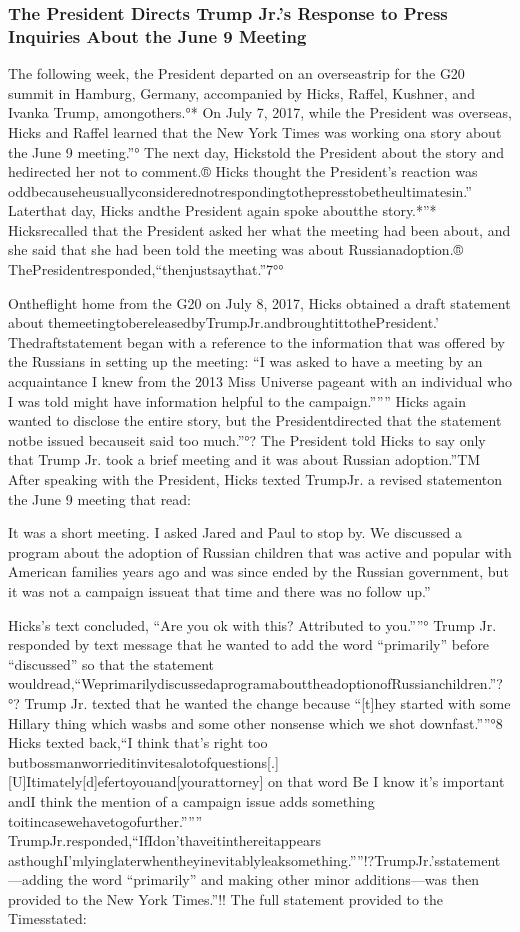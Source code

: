 \subsubsection{The President Directs Trump Jr.’s Response to Press Inquiries About the June 9 Meeting}

The following week, the President departed on an overseastrip for the G20 summit in Hamburg, Germany, accompanied by Hicks, Raffel, Kushner, and Ivanka Trump, amongothers.°* On July 7, 2017, while the President was overseas, Hicks and Raffel learned that the New York Times was working ona story about the June 9 meeting.”° The next day, Hickstold the President about the story and hedirected her not to comment.® Hicks thought the President’s reaction was oddbecauseheusuallyconsiderednotrespondingtothepresstobetheultimatesin.” Laterthat day, Hicks andthe President again spoke aboutthe story.*”* Hicksrecalled that the President asked her what the meeting had been about, and she said that she had been told the meeting was about Russianadoption.® ThePresidentresponded,“thenjustsaythat.”7°°

Ontheflight home from the G20 on July 8, 2017, Hicks obtained a draft statement about themeetingtobereleasedbyTrumpJr.andbroughtittothePresident.’ Thedraftstatement began with a reference to the information that was offered by the Russians in setting up the meeting: “I was asked to have a meeting by an acquaintance I knew from the 2013 Miss Universe pageant with an individual who I was told might have information helpful to the campaign.””” Hicks again wanted to disclose the entire story, but the Presidentdirected that the statement notbe
issued becauseit said too much.”°? The President told Hicks to say only that Trump Jr. took a brief meeting and it was about Russian adoption.”TM After speaking with the President, Hicks texted TrumpJr. a revised statementon the June 9 meeting that read:

It was a short meeting. I asked Jared and Paul to stop by. We discussed a program about the adoption of Russian children that was active and popular with American families years ago and was since ended by the Russian government, but it was not a campaign issueat that time and there was no follow up.”

Hicks’s text concluded, “Are you ok with this? Attributed to you.””° Trump Jr. responded by text message that he wanted to add the word “primarily” before “discussed” so that the statement wouldread,“WeprimarilydiscussedaprogramabouttheadoptionofRussianchildren.”?°? Trump Jr. texted that he wanted the change because “[t]hey started with some Hillary thing which wasbs and some other nonsense which we shot downfast.””°8 Hicks texted back,“I think that’s right too butbossmanworrieditinvitesalotofquestions[.] [U]Itimately[d]efertoyouand[yourattorney] on that word Be I know it’s important andI think the mention of a campaign issue adds something toitincasewehavetogofurther.””” TrumpJr.responded,“IfIdon’thaveitinthereitappears asthoughI’mlyinglaterwhentheyinevitablyleaksomething.””!?TrumpJr.’sstatement—adding the word “primarily” and making other minor additions—was then provided to the New York Times.”!! The full statement provided to the Timesstated:

